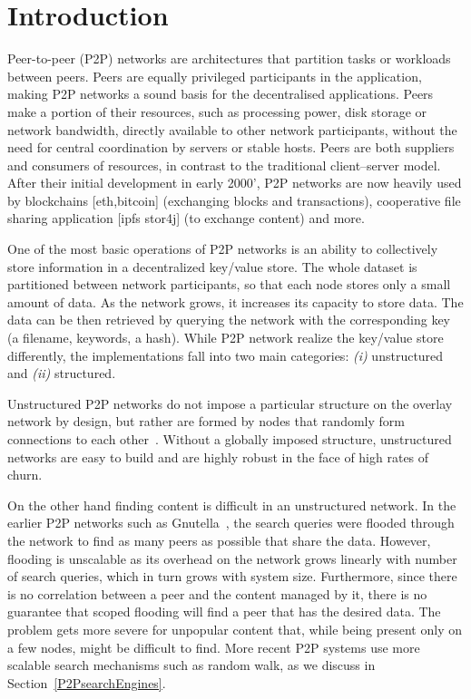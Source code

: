 
\section{Introduction}

Peer-to-peer (P2P) networks are architectures that partition tasks or workloads between peers. Peers are equally privileged participants in the application, making P2P networks a sound basis for the decentralised applications. Peers make a portion of their resources, such as processing power, disk storage or network bandwidth, directly available to other network participants, without the need for central coordination by servers or stable hosts. Peers are both suppliers and consumers of resources, in contrast to the traditional client–server model. After their initial development in early 2000', P2P networks are now heavily used by blockchains [eth,bitcoin] (exchanging blocks and transactions), cooperative file sharing application [ipfs stor4j] (to exchange content) and more. 

One of the most basic operations of P2P networks is an ability to collectively store information in a decentralized key/value store. The whole dataset is partitioned between network participants, so that each node stores only a small amount of data. As the network grows, it increases its capacity to store data. The data can be then retrieved by querying the network with the corresponding key (\eg a filename, keywords, a hash). While P2P network realize the key/value store differently, the implementations fall into two main categories: \textit{(i)} unstructured and \textit{(ii)} structured.

Unstructured P2P networks do not impose a particular structure on the overlay network by design, but rather are formed by nodes that randomly form connections to each other~\cite{gnutella, gossip, kazaa}. Without a globally imposed structure, unstructured networks are easy to build and are highly robust in the face of high rates of churn. 

On the other hand finding content is difficult in an unstructured network. In the earlier P2P networks such as Gnutella~\cite{gnutella}, the search queries were flooded through the network to find as many peers as possible that share the data. However, flooding is unscalable as its overhead on the network grows linearly with number of search queries, which in turn grows with system size. Furthermore, since there is no correlation between a peer and the content managed by it, there is no guarantee that scoped flooding will find a peer that has the desired data. The problem gets more severe for unpopular content that, while being present only on a few nodes, might be difficult to find. More recent P2P systems use more scalable search mechanisms such as random walk, as we discuss in Section~\ref{P2PsearchEngines}. 

